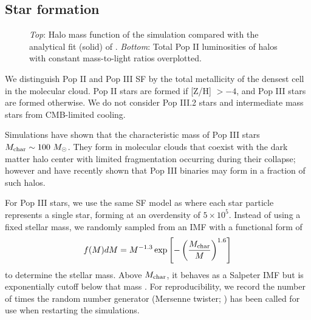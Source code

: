 \documentclass[apjl]{emulateapj}
\newcommand{\Ms}{\ifmmode{M_\odot}\else{$M_\odot$}\fi}
\begin{document}

\subsection{Star formation}

\begin{figure}
\caption{\label{fig:massfn} \textit{Top}: Halo mass function of the
  simulation compared with the analytical fit (solid) of
  \citet{Warren06}.  \textit{Bottom}: Total Pop II luminosities of
  halos with constant mass-to-light ratios overplotted.}
\end{figure}

We distinguish Pop II and Pop III SF by the total metallicity of the
densest cell in the molecular cloud.  Pop II stars are formed if [Z/H]
$> -4$, and Pop III stars are formed otherwise.  We do not consider
Pop III.2 stars and intermediate mass stars from CMB-limited cooling.

Simulations have shown that the characteristic mass of Pop III stars
$M_{\rm char} \sim 100~\Ms$.  They form in molecular clouds that
coexist with the dark matter halo center with limited fragmentation
occurring during their collapse; however \citet{2009Sci...325..601T}
and \citet{Stacy10_Binary} have recently shown that Pop III binaries
may form in a fraction of such halos.


For Pop III stars, we use the same SF model as \citet{Wise08_Gal} where
each star particle represents a single star, forming at an overdensity
of $5 \times 10^5$.  Instead of using a fixed stellar mass, we randomly
sampled from an IMF with a functional form of
%
\begin{equation}
\label{eqn:imf}
f(M)dM = M^{-1.3} \exp\left[-\left(\frac{M_{\rm char}}{M}\right)^{1.6}\right]
\end{equation}
to determine the stellar mass.  Above $M_{\rm char}$, it behaves as a
Salpeter IMF but is exponentially cutoff below that mass
\citep{Chabrier03, Clark09}.  For reproducibility, we record the number
of times the random number generator (Mersenne twister;
\citet{MTwister}) has been called for use when restarting the
simulations.
\end{document}
